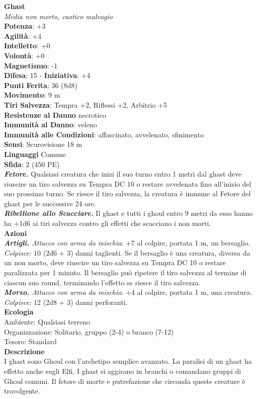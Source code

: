 \begin{multicols}{2}
\medskip\textbf{Ghast}\\
\emph{Media non morto, caotico malvagio}\\
\textbf{Potenza}: +3\\
\textbf{Agilità}: +4\\
\textbf{Intelletto}: +0\\
\textbf{Volontà}: +0\\
\textbf{Magnetismo}: -1\\
\textbf{Difesa}: 15 - \textbf{Iniziativa}: +4\\
\textbf{Punti Ferita}: 36 (8d8)\\
\textbf{Movimento}: 9 m\\
\textbf{Tiri Salvezza}: Tempra +2, Riflessi +2, Arbitrio +5\\
\textbf{Resistenze al Danno} necrotico\\
\textbf{Immunità al Danno}: veleno\\
\textbf{Immunità alle Condizioni}: affascinato, avvelenato, sfinimento\\
\textbf{Sensi}: Scurovisione 18 m \\
\textbf{Linguaggi} Comune\\
\textbf{Sfida}: 2 (450 PE)\smallskip\\
\emph{\textbf{Fetore.}} Qualsiasi creatura che inizi il suo turno entro 1 metri dal ghast deve riuscire un tiro salvezza su Tempra DC 10 o restare avvelenata fino all'inizio del suo prossimo turno. Se riesce il tiro  salvezza, la creatura è immune al Fetore del ghast per le successive 24 ore.\\
\emph{\textbf{Ribellione allo Scacciare.}} Il ghast e tutti i ghoul entro 9 metri da esso hanno ha +1d6 ai tiri salvezza contro gli effetti che scacciano i non morti. \\
\smallskip\textbf{Azioni}\\
\emph{\textbf{Artigli.} Attacco con arma da mischia}: +7 al colpire, portata 1 m, un bersaglio.\\
\emph{Colpisce:} 10 (2d6 + 3) danni taglienti. Se il bersaglio è una creatura, diversa da un non morto, deve riuscire un tiro salvezza su Tempra DC 10 o restare paralizzata per 1 minuto. Il bersaglio può ripetere il tiro salvezza al termine di ciascun suo round, terminando l'effetto se riesce il tiro salvezza.\\
\emph{\textbf{Morso.} Attacco con arma da mischia}: +4 al colpire, portata 1 m, una creatura.\\
\emph{Colpisce:} 12 (2d8 + 3) danni perforanti.\\
\textbf{Ecologia}\\
Ambiente: Qualsiasi terreno\\
Organizzazione: Solitario, gruppo (2-4) o branco (7-12)\\
Tesoro: Standard\\
\textbf{Descrizione}\\
I ghast sono Ghoul con l’archetipo semplice avanzato. La paralisi di un ghast ha effetto anche sugli Elfi. I ghast si aggirano in branchi o comandano gruppi di Ghoul comuni. Il fetore di morte e putrefazione che circonda queste creature è travolgente.\\



\end{multicols}
